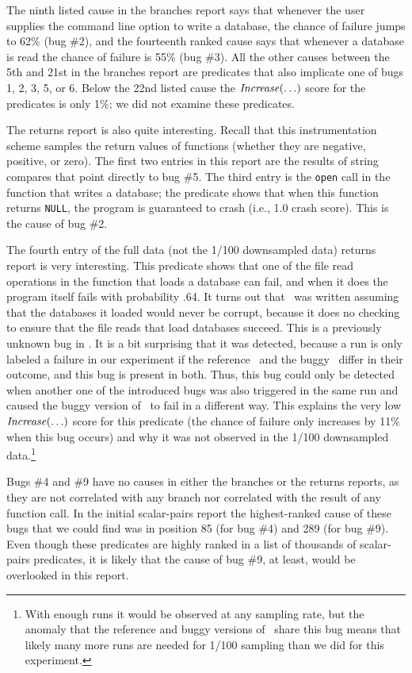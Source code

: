 The ninth listed cause in the branches report says that whenever the
user supplies the command line option to write a database, the chance
of failure jumps to 62\% (bug \#2), and the fourteenth ranked cause
says that whenever a database is read the chance of failure is 55\%
(bug \#3).  All the other causes between the 5th and 21st in the branches report are predicates that also implicate one of bugs 1, 2, 3, 5, or 6.  Below
the 22nd listed cause the $\mbox{\textit{Increase}}(\ldots)$ score for the predicates is
only 1\%; we did not examine these predicates.

The returns report is also quite interesting.  Recall that this
instrumentation scheme samples the return values of functions (whether
they are negative, positive, or zero).  The first two entries in this
report are the results of string compares that point directly to bug
\#5.  The third entry is the {\tt open} call in the function that writes
a database; the predicate shows that when this function returns {\tt NULL},
the program is guaranteed to crash (i.e., 1.0 crash score).  This is the
cause of bug \#2.

The fourth entry of the full data (not the 1/100 downsampled data)
returns report is very interesting.  This predicate shows that one of
the file read operations in the function that loads a database can
fail, and when it does the program itself fails with probability .64.
It turns out that \moss\ was written assuming that the databases it
loaded would never be corrupt, because it does no checking to ensure
that the file reads that load databases succeed.  This is a previously
unknown bug in \moss.  It is a bit surprising that it was detected,
because a run is only labeled a failure in our experiment if the
reference \moss\ and the buggy \moss\ differ in their outcome, and
this bug is present in both.  Thus, this bug could only be detected
when another one of the introduced bugs was also triggered in the same
run and caused the buggy version of \moss\ to fail in a different way.
This explains the very low $\mbox{\textit{Increase}}(\ldots)$ score for this
predicate (the chance of failure only increases by 11\% when this bug
occurs) and why it was not observed in the 1/100 downsampled data.\footnote{With enough runs it would be observed at any sampling rate, but the anomaly that
the reference and buggy versions of \moss\ share this bug means that likely
many more runs are needed for 1/100 sampling than we did for this experiment.}

Bugs \#4 and \#9 have no causes in either the branches or the returns
reports, as they are not correlated with any branch nor correlated
with the result of any function call.  In the initial scalar-pairs
report the highest-ranked cause of these bugs that we could find was
in position 85 (for bug \#4) and 289 (for bug \#9).
Even though these predicates are highly ranked in a list of thousands
of scalar-pairs predicates, it is likely that the cause of bug \#9, at
least, would be overlooked in this report.

